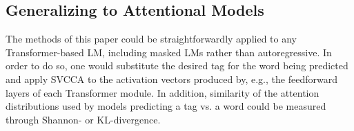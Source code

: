 \subsection{Generalizing to Attentional Models}

The methods of this paper could be straightforwardly applied to any Transformer-based LM, including masked LMs rather than autoregressive. In order to do so, one would substitute the desired tag for the word being predicted and apply SVCCA to the activation vectors produced by, e.g., the feedforward layers of each Transformer module. In addition, similarity of the attention distributions used by models predicting a tag vs. a word could be measured through Shannon- or KL-divergence.